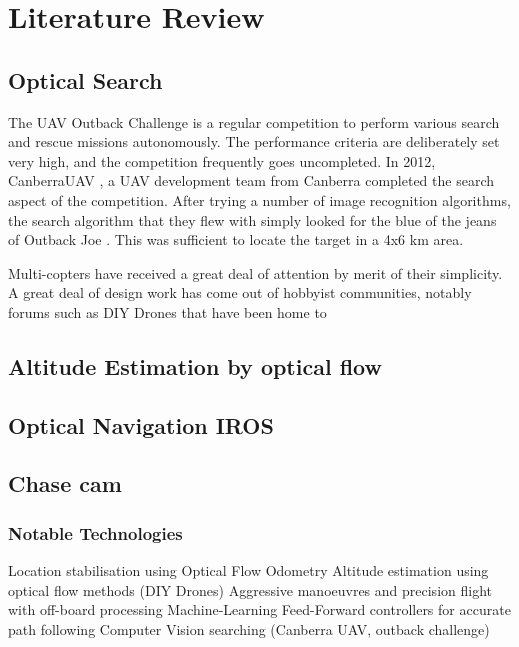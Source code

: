 \documentclass[a4paper, 11pt, titlepage]{article}
\begin{document}
  \section{Literature Review}

  \subsection{Optical Search}
    The UAV Outback Challenge \cite{OutbackChallenge} is a regular competition to perform various search and rescue missions autonomously.  The performance criteria are deliberately set very high, and the competition frequently goes uncompleted.  
    In 2012, CanberraUAV \cite{canberrauav}, a UAV development team from Canberra completed the search aspect of the competition.
    After trying a number of image recognition algorithms, the search algorithm that they flew with simply looked for the blue of the jeans of Outback Joe \cite{tridge}.  This was sufficient to locate the target in a 4x6 km area.

    Multi-copters have received a great deal of attention by merit of their simplicity.  A great deal of design work has come out of hobbyist communities, notably forums 
    such as DIY Drones \cite{DIYDrones} that have been home to 

    \subsection{Altitude Estimation by optical flow}
    \subsection{Optical Navigation IROS}
    \subsection{Chase cam}

    \subsubsection{Notable Technologies}
    Location stabilisation using Optical Flow Odometry
    Altitude estimation using optical flow methods (DIY Drones)
    Aggressive manoeuvres and precision flight with off-board processing
    Machine-Learning Feed-Forward controllers for accurate path following
    Computer Vision searching (Canberra UAV, outback challenge)
\end{document}
